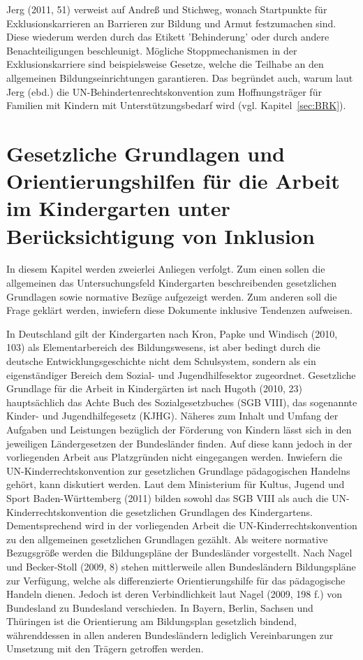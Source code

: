 Jerg (2011, 51) verweist auf Andreß und Stichweg, wonach Startpunkte für Exklusionskarrieren an Barrieren zur Bildung und Armut festzumachen sind. Diese wiederum werden durch das Etikett 'Behinderung' oder durch andere Benachteiligungen beschleunigt. Mögliche Stoppmechanismen in der Exklusionskarriere sind beispielsweise Gesetze, welche die Teilhabe an den allgemeinen Bildungseinrichtungen garantieren. Das begründet auch, warum laut Jerg (ebd.) die UN-Behindertenrechtskonvention zum Hoffnungsträger für Familien mit Kindern mit Unterstützungsbedarf wird (vgl. Kapitel~\ref{sec:BRK}). 

\section{Gesetzliche Grundlagen und Orientierungshilfen für die Arbeit im Kindergarten unter Berücksichtigung von Inklusion}

In diesem Kapitel werden zweierlei Anliegen verfolgt. Zum einen sollen die allgemeinen das Untersuchungsfeld Kindergarten beschreibenden gesetzlichen Grundlagen sowie normative Bezüge aufgezeigt werden. Zum anderen soll die Frage geklärt werden, inwiefern diese Dokumente inklusive Tendenzen aufweisen. 

In Deutschland gilt der Kindergarten nach Kron, Papke und Windisch (2010, 103) als Elementarbereich des Bildungswesens, ist aber bedingt durch die deutsche Entwicklungsgeschichte nicht dem Schulsystem, sondern als ein eigenständiger Bereich dem Sozial- und Jugendhilfesektor zugeordnet. 
Gesetzliche Grundlage für die Arbeit in Kindergärten ist nach Hugoth (2010, 23) hauptsächlich das Achte Buch des Sozialgesetzbuches (SGB VIII), das sogenannte Kinder- und Jugendhilfegesetz (KJHG). Näheres zum Inhalt und Umfang der Aufgaben und Leistungen bezüglich der Förderung von Kindern lässt sich in den jeweiligen Ländergesetzen der Bundesländer finden. Auf diese kann jedoch in der vorliegenden Arbeit aus Platzgründen nicht eingegangen werden. 
Inwiefern die UN-Kinderrechtskonvention zur gesetzlichen Grundlage pädagogischen Handelns gehört, kann diskutiert werden. Laut dem Ministerium für Kultus, Jugend und Sport Baden-Württemberg (2011) bilden sowohl das SGB VIII als auch die UN-Kinderrechtskonvention die gesetzlichen Grundlagen des Kindergartens. Dementsprechend wird in der vorliegenden Arbeit die UN-Kinderrechtskonvention zu den allgemeinen gesetzlichen Grundlagen gezählt. 
Als weitere normative Bezugsgröße werden die Bildungspläne der Bundesländer vorgestellt. Nach Nagel und Becker-Stoll (2009, 8) stehen  mittlerweile allen Bundesländern Bildungspläne zur Verfügung, welche als differenzierte Orientierungshilfe für das pädagogische Handeln dienen. Jedoch ist deren Verbindlichkeit laut Nagel (2009, 198 f.) von Bundesland zu Bundesland verschieden. In Bayern, Berlin, Sachsen und Thüringen ist die Orientierung am Bildungsplan gesetzlich bindend, währenddessen in allen anderen Bundesländern lediglich Vereinbarungen zur Umsetzung mit den Trägern getroffen werden.
 

